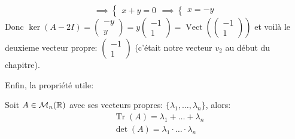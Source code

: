 \begin{eg}
\[       \implies \begin{cases}
           x + y = 0
       \end{cases} \implies \begin{cases}
           x = -y
       \end{cases}
   \] 
   Donc $\ker(A - 2I) = \begin{pmatrix} -y \\ y \end{pmatrix} = y \begin{pmatrix} -1 \\ 1 \end{pmatrix} = \operatorname{Vect}(\begin{pmatrix} -1 \\ 1 \end{pmatrix} )  $ et voilà le deuxieme vecteur propre: $\begin{pmatrix} -1 \\ 1 \end{pmatrix} $ (c'était notre vecteur $v_2$ au début du chapitre).
\end{eg}

Enfin, la propriété utile:
\begin{prop}
    Soit $A \in \mathcal{M}_n(\mathbb{R})$ avec ses vecteurs propres: $\{\lambda_1, \ldots, \lambda_n\}$, alors:
    \begin{align*}
        &\operatorname{Tr}(A) = \lambda_1 + \ldots + \lambda_n\\
        &\operatorname{det}(A) = \lambda_1 \cdot  \ldots \cdot  \lambda_n\\
    \end{align*}
\end{prop}

